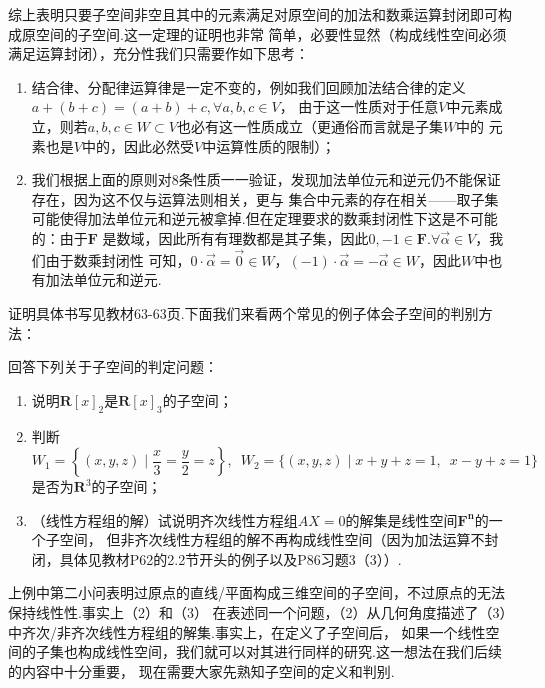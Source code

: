 综上表明只要子空间非空且其中的元素满足对原空间的加法和数乘运算封闭即可构成原空间的子空间.这一定理的证明也非常
简单，必要性显然（构成线性空间必须满足运算封闭），充分性我们只需要作如下思考：
\begin{enumerate}
    \item 结合律、分配律运算律是一定不变的，例如我们回顾加法结合律的定义$a+(b+c)=(a+b)+c,\forall a,b,c\in V$，
    由于这一性质对于任意$V$中元素成立，则若$a,b,c\in W\subset V$也必有这一性质成立（更通俗而言就是子集$W$中的
    元素也是$V$中的，因此必然受$V$中运算性质的限制）；
    \item 我们根据上面的原则对8条性质一一验证，发现加法单位元和逆元仍不能保证存在，因为这不仅与运算法则相关，更与
    集合中元素的存在相关——取子集可能使得加法单位元和逆元被拿掉.但在定理要求的数乘封闭性下这是不可能的：由于$\mathbf{F}$
    是数域，因此所有有理数都是其子集，因此$0,-1\in\mathbf{F}$.$\forall \vec{\alpha}\in V$，我们由于数乘封闭性
    可知，$0\cdot\vec{\alpha}=\vec{0}\in W$，$(-1)\cdot\vec{\alpha}=-\vec{\alpha}\in W$，因此$W$中也有加法单位元和逆元.
\end{enumerate}

证明具体书写见教材63-63页.下面我们来看两个常见的例子体会子空间的判别方法：
\begin{example}
    回答下列关于子空间的判定问题：
    \begin{enumerate}[label=(\arabic*)]
        \item 说明$\mathbf{R}[x]_2$是$\mathbf{R}[x]_3$的子空间；

        \item 判断$W_1=\left\{(x,y,z) \mid \dfrac{x}{3}=\dfrac{y}{2}=z\right\},\enspace
            W_2=\{(x,y,z) \mid x+y+z=1,\enspace x-y+z=1\}$是否为$\mathbf{R}^3$的子空间；

        \item （线性方程组的解）试说明齐次线性方程组$AX=0$的解集是线性空间$\mathbf{F^n}$的一个子空间，
        但非齐次线性方程组的解不再构成线性空间（因为加法运算不封闭，具体见教材P62的2.2节开头的例子以及P86习题3（3））.
    \end{enumerate}
\end{example}

上例中第二小问表明过原点的直线/平面构成三维空间的子空间，不过原点的无法保持线性性.事实上（2）和（3）
在表述同一个问题，（2）从几何角度描述了（3）中齐次/非齐次线性方程组的解集.事实上，在定义了子空间后，
如果一个线性空间的子集也构成线性空间，我们就可以对其进行同样的研究.这一想法在我们后续的内容中十分重要，
现在需要大家先熟知子空间的定义和判别.

